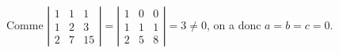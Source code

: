 {{ 
Comme $\left|
\begin{array}{ccc}
1&1&1\\
1&2&3\\
2&7&15
\end{array}
\right|=\left|
\begin{array}{ccc}
1&0&0\\
1&1&1\\
2&5&8
\end{array}
\right|=3\neq0$, on a donc $a=b=c=0$.}
}